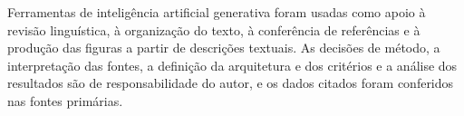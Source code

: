 Ferramentas de inteligência artificial generativa foram usadas como apoio à revisão linguística, à organização do texto, à conferência de referências e à produção das figuras a partir de descrições textuais. As decisões de método, a interpretação das fontes, a definição da arquitetura e dos critérios e a análise dos resultados são de responsabilidade do autor, e os dados citados foram conferidos nas fontes primárias.
